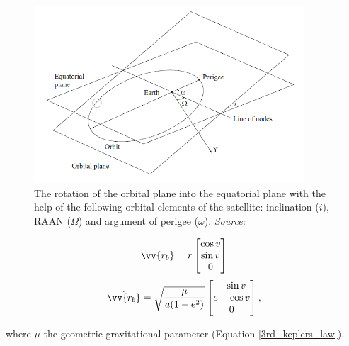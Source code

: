 \begin{figure}
\centering
\includegraphics[width=0.9\textwidth]{Images/orbit_to_space.png}\caption{The rotation of the orbital plane into the equatorial plane with the help of the following orbital elements of the satellite: inclination ($i$), RAAN ($\Omega$) and argument of perigee ($\omega$). \textit{Source: \cite{Montenbruck}}}
\label{orbit_to_space} 
\end{figure}

\begin{equation}
\label{position_orbital}
\vv{r_{b}} = r \begin{bmatrix} \cos{v} \\ \sin{v} \\ 0 \end{bmatrix}
\end{equation}
\begin{equation}
\label{velocity_orbital}
\dot{\vv{r_{b}}} = \sqrt{\frac{\mu}{a (1 - e^2)}} \begin{bmatrix} -\sin{v} \\ e + \cos{v} \\ 0 \end{bmatrix},
\end{equation}

where $\mu$ the geometric gravitational parameter (Equation \ref{3rd_keplers_law}).


